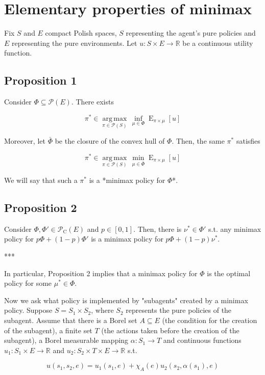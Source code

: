 \documentclass[a4paper]{article}
\DeclareMathOperator{\E}{E}
\newcommand{\Argmax}[1]{\underset{#1}{\operatorname{arg\,max}}\,}
\newcommand{\Reals}{\mathbb{R}}
\newcommand{\Prob}{\mathcal{P}}
\newcommand{\CC}{\mathcal{P}_{\operatorname{C}}}
\begin{document}
\section{Elementary properties of minimax}

Fix ${S}$ and ${E}$ compact Polish spaces, ${S}$ representing the agent's pure policies and ${E}$ representing the pure environments. Let ${u: S \times E \rightarrow \Reals}$ be a continuous utility function.

\subsection{Proposition 1}

Consider ${\Phi \subseteq \Prob(E)}$. There exists 

$${\pi^* \in \Argmax{\pi \in \Prob(S)} \inf_{\mu \in \Phi} \E_{\pi \times \mu}[u]}$$

Moreover, let ${\bar{\Phi}}$ be the closure of the convex hull of ${\Phi}$. Then, the same ${\pi^*}$ satisfies

$${\pi^* \in \Argmax{\pi \in \Prob(S)} \min_{\mu \in \bar{\Phi}} \E_{\pi \times \mu}[u]}$$

We will say that such a ${\pi^*}$ is a *minimax policy for ${\Phi}$*.

\subsection{Proposition 2}

Consider ${\Phi, \Phi' \in \CC(E)}$ and ${p \in [0,1]}$. Then, there is ${\nu^* \in \Phi'}$ s.t. any minimax policy for ${p\Phi+(1-p)\Phi'}$ is a minimax policy for ${p\Phi+(1-p)\nu^*}$.

***

In particular, Proposition 2 implies that a minimax policy for ${\Phi}$ is the optimal policy for some ${\mu^* \in \Phi}$.

Now we ask what policy is implemented by "subagents" created by a minimax policy. Suppose ${S = S_1 \times S_2}$, where ${S_2}$ represents the pure policies of the subagent. Assume that there is a Borel set ${A \subseteq E}$ (the condition for the creation of the subagent), a finite set ${T}$ (the actions taken before the creation of the subagent), a Borel measurable mapping ${\alpha: S_1 \rightarrow T}$ and continuous functions ${u_1: S_1 \times E \rightarrow \Reals}$ and ${u_2: S_2 \times T \times E \rightarrow \Reals}$ s.t. 

$${u(s_1,s_2,e)=u_1(s_1,e)+\chi_A(e) u_2(s_2,\alpha(s_1),e)}$$
\end{document}
